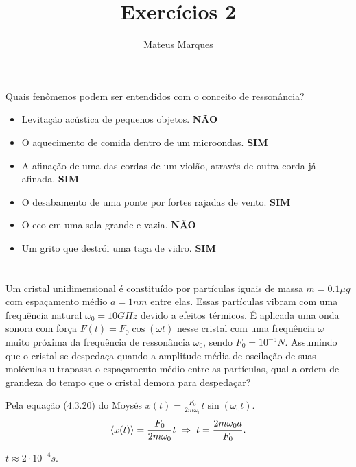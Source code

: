 \documentclass[a4paper,10pt]{article}
\title{\Huge{\textbf{Exercícios 2}}}
\author{Mateus Marques}
\begin{document}
\maketitle

\section{}

Quais fenômenos podem ser entendidos com o conceito de ressonância?
\begin{itemize}
\item Levitação acústica de pequenos objetos. \textbf{NÃO}
\item O aquecimento de comida dentro de um microondas. \textbf{SIM}
\item A afinação de uma das cordas de um violão, através de outra corda já afinada. \textbf{SIM}
\item O desabamento de uma ponte por fortes rajadas de vento. \textbf{SIM}
\item O eco em uma sala grande e vazia. \textbf{NÃO}
\item Um grito que destrói uma taça de vidro. \textbf{SIM}
\end{itemize}


\section{}

Um cristal unidimensional é constituído por partículas iguais de massa $m = 0.1 \unit{\mu g}$ com espaçamento médio $a = 1 \unit{nm}$ entre elas. Essas partículas vibram com uma frequência natural $\omega_0 = 10 \unit{GHz}$ devido a efeitos térmicos. É aplicada uma onda sonora com força $F(t) = F_0 \cos(\omega t)$ nesse cristal com uma frequência $\omega$ muito próxima da frequência de ressonância $\omega_0$, sendo $F_0 = 10^{-5} \unit{N}$. Assumindo que o cristal se despedaça quando a amplitude média de oscilação de suas moléculas ultrapassa o espaçamento médio entre as partículas, qual a ordem de grandeza do tempo que o cristal demora para despedaçar?

Pela equação (4.3.20) do Moysés $x(t) = \frac{F_0}{2m\omega_0} t \sin(\omega_0 t)$.
$$
\ev{x(t)} = \frac{F_0}{2m\omega_0} t \implies t = \frac{2m\omega_0 a}{F_0}.
$$

$t \approx 2 \cdot 10^{-4} \unit{s}$.
\end{document}
